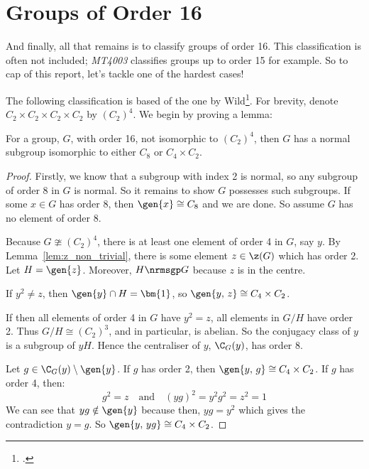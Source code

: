\section{Groups of Order 16}
And finally, all that remains is to classify groups of order 16.
This classification is often not included; \textit{MT4003} classifies groups up to order 15 for example.
So to cap of this report, let's tackle one of the hardest cases!

The following classification is based of the one by Wild\footcite{order16}.
For brevity, denote \(C_2 \times C_2 \times C_2 \times C_2\) by \({(C_2)}^4\).
We begin by proving a lemma:

\begin{lemma}\label{lem:order_16_subgp}
    \raggedright
    For a group, \(G\), with order 16, not isomorphic to \({(C_2)}^4\), then \(G\) has a
    normal subgroup isomorphic to either \(C_8\) or \(C_4 \times C_2\).
\end{lemma}

\begin{proof}
    Firstly, we know that a subgroup with index 2 is normal, so any subgroup of order 8 in \(G\) is normal.
    So it remains to show \(G\) possesses such subgroups.
    If some \(x \in G\) has order 8, then \(\gen{x} \cong C_8\) and we are done.
    So assume \(G\) has no element of order 8.

    Because \(G \ncong {(C_2)}^4\), there is at least one element of order 4 in \(G\), say \(y\).
    By Lemma~\ref{lem:z_non_trivial}, there is some element \(z \in \z(G)\) which has order 2.
    Let \(H = \gen{z}\).
    Moreover, \(H \nrmsgp G\) because \(z\) is in the centre.

    If \(y^2 \neq z\), then \(\gen{y} \cap H = \bm{1}\), so \(\gen{y,\,z} \cong C_4 \times C_2\).

    If then all elements of order 4 in \(G\) have \(y^2 = z\), all elements in \(G/H\) have order 2.
    Thus \(G/H \cong {(C_2)}^3\), and in particular, is abelian.
    So the conjugacy class of \(y\) is a subgroup of \(yH\).
    Hence the centraliser of \(y\), \(\C_G(y)\), has order 8.

    Let \(g \in \C_G(y) \setminus \gen{y}\).
    If \(g\) has order 2, then \(\gen{y,\,g} \cong C_4 \times C_2\).
    If \(g\) has order 4, then:
    \[g^2 = z \quad \text{and} \quad {(yg)}^2 = y^2 g^2 = z^2 = 1\]
    We can see that \(yg \notin \gen{y}\) because then, \(yg = y^2\) which gives the contradiction \(y = g\).
    So \(\gen{y,\,yg} \cong C_4 \times C_2\).
\end{proof}

